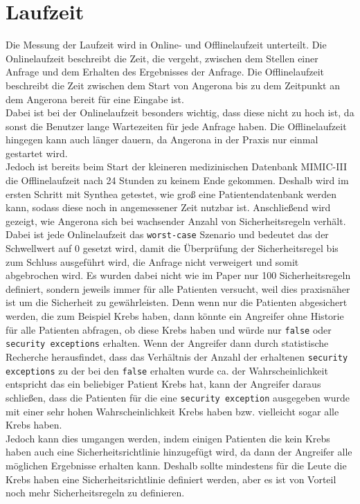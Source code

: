\documentclass[german,version-2020-11]{uzl-thesis}
\begin{document}
\section{Laufzeit}
Die Messung der Laufzeit wird in Online- und Offlinelaufzeit unterteilt. Die Onlinelaufzeit beschreibt die Zeit, die vergeht, zwischen dem Stellen einer Anfrage und dem Erhalten des Ergebnisses der Anfrage. Die Offlinelaufzeit beschreibt die Zeit zwischen dem Start von Angerona bis zu dem Zeitpunkt an dem Angerona bereit für eine Eingabe ist. \\ 
Dabei ist bei der Onlinelaufzeit besonders wichtig, dass diese nicht zu hoch ist, da sonst die Benutzer lange Wartezeiten  für jede Anfrage haben. Die Offlinelaufzeit hingegen kann auch länger dauern, da Angerona in der Praxis nur einmal gestartet wird.  \\
Jedoch ist bereits beim Start der kleineren medizinischen Datenbank MIMIC-III die Offlinelaufzeit nach 24 Stunden zu keinem Ende gekommen. Deshalb wird im ersten Schritt mit Synthea getestet, wie groß eine Patientendatenbank werden kann, sodass diese noch in angemessener Zeit nutzbar ist.   
Anschließend wird gezeigt, wie Angerona sich bei wachsender Anzahl von Sicherheitsregeln verhält.\\ 
Dabei ist jede Onlinelaufzeit das \texttt{worst-case} Szenario und bedeutet das der Schwellwert auf 0 gesetzt wird, damit die Überprüfung der Sicherheitsregel bis zum Schluss ausgeführt wird, die Anfrage nicht verweigert und somit abgebrochen wird. Es wurden dabei nicht wie im Paper nur 100 Sicherheitsregeln definiert, sondern jeweils immer für alle Patienten versucht, weil dies praxisnäher ist um die Sicherheit zu gewährleisten. Denn wenn nur die Patienten abgesichert werden, die zum Beispiel Krebs haben, dann könnte ein Angreifer ohne Historie für alle Patienten abfragen, ob diese Krebs haben und würde nur \texttt{false} oder \texttt{security exceptions} erhalten. Wenn der Angreifer dann durch statistische Recherche herausfindet, dass das Verhältnis der Anzahl der erhaltenen \texttt{security exceptions} zu der bei den \texttt{false} erhalten wurde ca. der Wahrscheinlichkeit entspricht das ein beliebiger Patient Krebs hat, kann der Angreifer daraus schließen, dass die Patienten für die eine \texttt{security exception} ausgegeben wurde mit einer sehr hohen Wahrscheinlichkeit Krebs haben bzw. vielleicht sogar alle Krebs haben. \\ 
Jedoch kann dies umgangen werden, indem einigen Patienten die kein Krebs haben auch eine Sicherheitsrichtlinie hinzugefügt wird, da dann der Angreifer alle möglichen Ergebnisse erhalten kann. Deshalb sollte mindestens für die Leute die Krebs haben eine Sicherheitsrichtlinie definiert werden, aber es ist von Vorteil noch mehr Sicherheitsregeln zu definieren.
\end{document}
